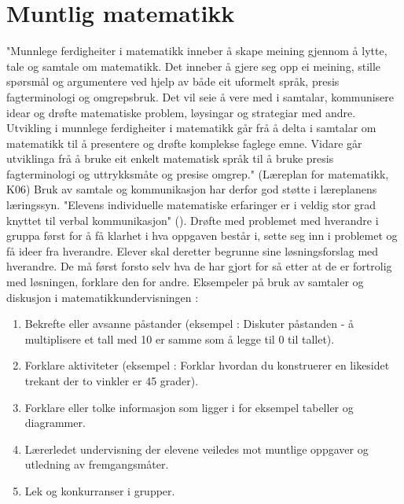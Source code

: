 \documentclass[12pt,twoside,onecolumn,norsk]{article}
\begin{document}
\section*{Muntlig matematikk}
"Munnlege ferdigheiter i matematikk inneber å skape meining gjennom å lytte, tale og 
samtale om matematikk. Det inneber å gjere seg opp ei meining, stille spørsmål og 
argumentere ved hjelp av både eit uformelt språk, presis fagterminologi og omgrepsbruk. 
Det vil seie å vere med i samtalar, kommunisere idear og drøfte matematiske problem, 
løysingar og strategiar med andre. Utvikling i munnlege ferdigheiter i matematikk går 
frå å delta i samtalar om matematikk til å presentere og drøfte komplekse faglege emne. 
Vidare går utviklinga frå å bruke eit enkelt matematisk språk til å bruke presis 
fagterminologi og uttrykksmåte og presise omgrep." (Læreplan for matematikk, K06)
\newline
\newline
Bruk av samtale og kommunikasjon har derfor god støtte i læreplanens læringssyn.
"Elevens individuelle matematiske erfaringer er i veldig stor grad knyttet til verbal
kommunikasjon" ().
\newline
\newline
Drøfte med problemet med hverandre i gruppa først for å få klarhet i hva oppgaven
består i, sette seg inn i problemet og få ideer fra hverandre.
Elever skal deretter begrunne sine løsningsforslag med hverandre. De må først forsto
selv hva de har gjort for så etter at de er fortrolig med løsningen, forklare den 
for andre.
\newline
\newline
Eksempeler på bruk av samtaler og diskusjon i matematikkundervisningen :
\begin{enumerate}
\item Bekrefte eller avsanne påstander (eksempel : Diskuter påstanden - å multiplisere
et tall med 10 er samme som å legge til 0 til tallet).
\item Forklare aktiviteter (eksempel : Forklar hvordan du konstruerer en likesidet 
trekant der to vinkler er 45 grader).
\item Forklare eller tolke informasjon som ligger i for eksempel tabeller og 
diagrammer.
\item Lærerledet undervisning der elevene veiledes mot muntlige oppgaver og utledning
av fremgangsmåter.
\item Lek og konkurranser i grupper.
\end{enumerate}
\end{document}
